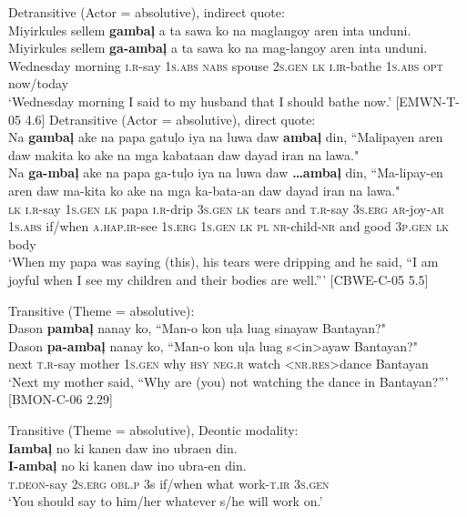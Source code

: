 \ea
\label{bkm:Ref361243181}
Detransitive (Actor = absolutive), indirect quote: \\
Miyirkules  sellem  \textbf{gambaļ}  a  ta  sawa  ko   na  maglangoy aren  inta  unduni. \\\smallskip
\gll Miyirkules  sellem  \textbf{ga-ambaļ}  a  ta  sawa  ko   na  mag-langoy aren  inta  unduni. \\
Wednesday  morning  \textsc{i.r}-say  1\textsc{s.abs}  \textsc{nabs}  spouse  2\textsc{s.gen}
\textsc{lk}  \textsc{i.ir}-bathe 1\textsc{s.abs}  \textsc{opt}  now/today \\
\glt ‘Wednesday morning I said to my husband that I should bathe now.’ [EMWN-T-05 4.6]
\z
\ea
\label{bkm:Ref402322324}
Detransitive (Actor = absolutive), direct quote: \\
Na  \textbf{gambaļ}  ake  na  papa  gatuļo  iya  na  luwa  daw \textbf{ambaļ}  din,  “Malipayen  aren  daw  makita  ko    ake  na  mga  kabataan  daw  dayad  iran  na  lawa." \\\smallskip
\gll Na  \textbf{ga-mbaļ}  ake  na  papa  ga-tuļo  iya  na  luwa  daw \textbf{ …ambaļ}  din,  “Ma-lipay-en  aren  daw  ma-kita  ko    ake  na  mga  ka-bata-an  daw  dayad  iran  na  lawa." \\
\textsc{lk}  \textsc{i.r}-say  1\textsc{s.gen}  \textsc{lk}  papa  \textsc{i.r}-drip  3\textsc{s.gen}  \textsc{lk}  tears  and
\textsc{t.r}-say  3\textsc{s.erg}  \textsc{ar}-joy-\textsc{ar}  1\textsc{s.abs}  if/when  \textsc{a.hap.ir}-see
1\textsc{s.erg}  1\textsc{s.gen}  \textsc{lk}  \textsc{pl}  \textsc{nr}-child-\textsc{nr}  and  good  3\textsc{p.gen}  \textsc{lk}  body \\
\glt `When my papa was saying (this), his tears were dripping and he said, “I am joyful when I see my children and their bodies are well.”’ [CBWE-C-05 5.5]
\z  

\ea
Transitive (Theme = absolutive): \\
Dason  \textbf{pambaļ}  nanay  ko,  “Man-o  kon  uļa  luag   sinayaw   Bantayan?" \\\smallskip
\gll Dason  \textbf{pa-ambaļ}  nanay  ko,  “Man-o  kon  uļa  luag   s<in>ayaw   Bantayan?" \\
next  \textsc{t.r}-say  mother  1\textsc{s.gen}  why  \textsc{hsy}  \textsc{neg.r}  watch
<\textsc{nr.res}>dance Bantayan \\
\glt `Next my mother said, “Why are (you) not watching the dance in Bantayan?”’ [BMON-C-06 2.29]
\z

\ea
Transitive (Theme = absolutive), Deontic modality: \\
\textbf{Iambaļ}  no  ki  kanen  daw  ino  ubraen  din. \\\smallskip
\gll \textbf{I-ambaļ}  no  ki  kanen  daw  ino  ubra-en  din. \\
\textsc{t.deon}-say  2\textsc{s.erg}  \textsc{obl.p}  3s  if/when  what  work-\textsc{t.ir}  3\textsc{s.gen} \\
\glt ‘You should say to him/her whatever s/he will work on.’
\z

